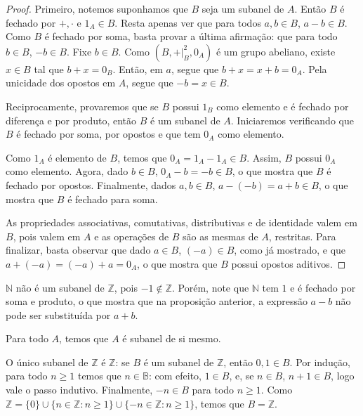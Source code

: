 \begin{proof}
    Primeiro, notemos suponhamos que $B$ seja um subanel de $A$. Então $B$ é fechado por $+, \cdot$ e $1_A\in B$. Resta apenas ver que para todos $a, b \in B$, $a-b \in B$.
    Como $B$ é fechado por soma, basta provar a última afirmação: que para todo $b \in B$, $-b \in B$.
    Fixe $b \in B$. Como $(B, +|_B^2, 0_A)$ é um grupo abeliano, existe $x \in B$ tal que $b+x=0_B$. Então, em $a$, segue que $b+x=x+b=0_A$. Pela unicidade dos opostos em $A$, segue que $-b=x\in B$.

    Reciprocamente, provaremos que se $B$ possui $1_B$ como elemento e é fechado por diferença e por produto, então $B$ é um subanel de $A$. Iniciaremos verificando que $B$ é fechado por soma, por opostos e que tem $0_A$ como elemento.

    Como $1_A$ é elemento de $B$, temos que $0_A=1_A-1_A\in B$. Assim, $B$ possui $0_A$ como elemento. Agora, dado $b \in B$, $0_A-b=-b \in B$, o que mostra que $B$ é fechado por opostos. Finalmente, dados $a, b \in B$, $a-(-b)=a+b\in B$, o que mostra que $B$ é fechado para soma.

    As propriedades associativas, comutativas, distributivas e de identidade valem em $B$, pois valem em $A$ e as operações de $B$ são as mesmas de $A$, restritas. Para finalizar, basta observar que dado $a \in B$, $(-a)\in B$, como já mostrado, e que $a+(-a)=(-a)+a=0_A$, o que mostra que $B$ possui opostos aditivos.
\end{proof}

\begin{exemplo}
$\mathbb N$ não é um subanel de $\mathbb Z$, pois $-1 \notin \mathbb Z$.
Porém, note que $\mathbb N$ tem $1$ e é fechado por soma e produto, o que mostra que na proposição anterior, a expressão $a-b$ não pode ser substituída por $a+b$.
\end{exemplo}

\begin{exemplo}
    Para todo $A$, temos que $A$ é subanel de si mesmo.
\end{exemplo}

\begin{exemplo}
O único subanel de $\mathbb Z$ é $\mathbb Z$: se $B$ é um subanel de $\mathbb Z$, então $0, 1 \in B$.
Por indução, para todo $n\geq 1$ temos que $n \in \mathbb B$: com efeito, $1\in B$, e, se $n \in B$, $n+1\in B$, logo vale o passo indutivo. Finalmente, $-n\in B$ para todo $n\geq 1$. Como $\mathbb Z=\{0\}\cup\{n \in \mathbb Z: n\geq 1\}\cup \{-n \in \mathbb Z: n\geq 1\}$, temos que $B=\mathbb Z$.
\end{exemplo}

